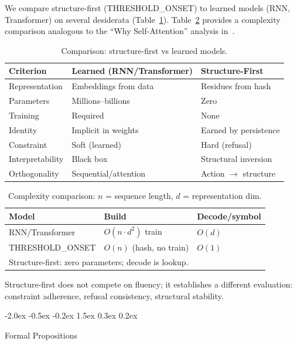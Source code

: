 \documentclass[10pt]{article}
\makeatletter
\renewcommand{\section}{\@startsection{section}{1}{\z@}%
  {-2.0ex \@plus -0.5ex \@minus -0.2ex}%
  {1.5ex \@plus 0.3ex \@minus 0.2ex}%
  {\large\bfseries\raggedright}}
\makeatother
\begin{document}
We compare structure-first (THRESHOLD\_ONSET) to learned models (RNN, Transformer) on several desiderata (Table~\ref{tab:compare}). Table~\ref{tab:complexity} provides a complexity comparison analogous to the ``Why Self-Attention'' analysis in~\cite{vaswani2017attention}.

\begin{table}[t]
\centering
\caption{Comparison: structure-first vs learned models.}
\label{tab:compare}
\begin{tabular}{lll}
\toprule
\textbf{Criterion} & \textbf{Learned (RNN/Transformer)} & \textbf{Structure-First} \\
\midrule
Representation & Embeddings from data & Residues from hash \\
Parameters & Millions--billions & Zero \\
Training & Required & None \\
Identity & Implicit in weights & Earned by persistence \\
Constraint & Soft (learned) & Hard (refusal) \\
Interpretability & Black box & Structural inversion \\
\midrule
Orthogonality & Sequential/attention & Action $\rightarrow$ structure \\
\bottomrule
\end{tabular}
\end{table}

\begin{table}[t]
\centering
\caption{Complexity comparison: $n$ = sequence length, $d$ = representation dim.}
\label{tab:complexity}
\begin{tabular}{lll}
\toprule
\textbf{Model} & \textbf{Build} & \textbf{Decode/symbol} \\
\midrule
RNN/Transformer & $O(n \cdot d^2)$ train & $O(d)$ \\
THRESHOLD\_ONSET & $O(n)$ (hash, no train) & $O(1)$ \\
\midrule
\multicolumn{3}{l}{\footnotesize Structure-first: zero parameters; decode is lookup.} \\
\bottomrule
\end{tabular}
\end{table}

Structure-first does not compete on fluency; it establishes a different evaluation: constraint adherence, refusal consistency, structural stability.

\section{Formal Propositions}
\label{sec:formal}
\end{document}
